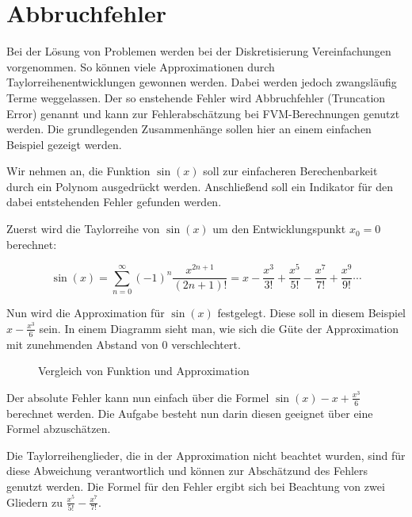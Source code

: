 \section{Abbruchfehler}

Bei der Lösung von Problemen werden bei der Diskretisierung Vereinfachungen vorgenommen.
So können viele Approximationen durch Taylorreihenentwicklungen gewonnen werden. Dabei
werden jedoch zwangsläufig Terme weggelassen. Der so enstehende Fehler wird
Abbruchfehler (Truncation Error) genannt und kann zur Fehlerabschätzung bei FVM-Berechnungen
genutzt werden. Die grundlegenden Zusammenhänge sollen hier an einem einfachen
Beispiel gezeigt werden.

Wir nehmen an, die Funktion $\sin(x)$ soll zur einfacheren Berechenbarkeit durch
ein Polynom ausgedrückt werden. Anschließend soll ein Indikator für den dabei
entstehenden Fehler gefunden werden.

Zuerst wird die Taylorreihe von $\sin(x)$ um den Entwicklungspunkt $x_0 =0$ berechnet:

\begin{equation}
  \sin(x) = \sum_{n=0}^{\infty}(-1)^n \frac{x^{2n+1}}{(2n+1)!} = 
  x-\frac{x^3}{3!} +\frac{x^5}{5!} -\frac{x^7}{7!} +\frac{x^9}{9!}\cdots
\end{equation}

Nun wird die Approximation für $\sin(x)$ festgelegt. Diese soll in diesem Beispiel
$x-\frac{x^3}{6} $ sein. In einem Diagramm sieht man, wie sich die Güte der
Approximation mit zunehmenden Abstand von $0$ verschlechtert.

\begin{figure}[h]
\centering
\caption{Vergleich von Funktion und Approximation}
\end{figure}

Der absolute Fehler kann nun einfach über die Formel $\sin(x) - x + \frac{x^3}{6}$
berechnet werden. Die Aufgabe besteht nun darin diesen geeignet über eine Formel abzuschätzen.

Die Taylorreihenglieder, die in der Approximation nicht beachtet wurden, sind für diese
Abweichung verantwortlich und können zur Abschätzund des Fehlers genutzt werden.
Die Formel für den Fehler ergibt sich bei Beachtung von zwei Gliedern zu
$\frac{x^5}{5!} -\frac{x^7}{7!} $.

